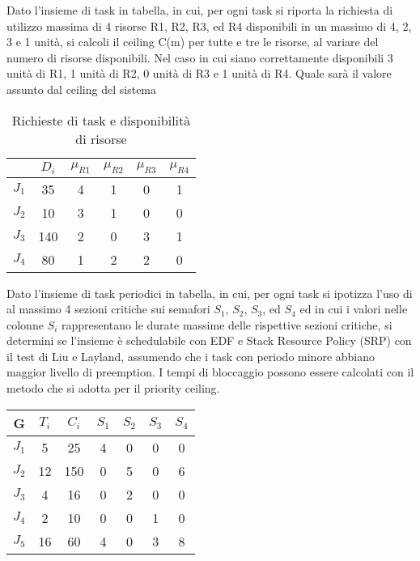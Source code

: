 \begin{Esercizio3}

Dato l'insieme di task in tabella, in cui, 
per ogni task si riporta la richiesta
 di utilizzo massima di 4 risorse R1, R2, R3, ed 
 R4 disponibili in un massimo di 4, 2, 3 e 1 unità, 
 si calcoli il ceiling C(m) per tutte e tre le risorse, 
 al variare del numero di risorse disponibili. 
 Nel caso in cui siano correttamente disponibili 3
  unità di R1, 1 unità di R2, 0 unità di R3 e 1 
  unità di R4. Quale sarà il valore assunto dal 
  ceiling del sistema 

  \begin{table}[!h]
\centering
\begin{tabular}{|c|c|c|c|c|c|}
\hline
& $D_i$ & $\mu_{R1}$ & $\mu_{R2}$ & $\mu_{R3}$ & $\mu_{R4}$ \\
\hline
$J_1$ & 35 & 4 & 1 & 0 & 1 \\
\hline
$J_2$ & 10 & 3 & 1 & 0 & 0 \\
\hline
$J_3$ & 140 & 2 & 0 & 3 & 1 \\
\hline
$J_4$ & 80 & 1 & 2 & 2 & 0 \\
\hline
\end{tabular}
\caption{Richieste di task e disponibilità di risorse}
\end{table}

\end{Esercizio3}


\begin{Esercizio4}

Dato l'insieme di task periodici in tabella, in cui, per ogni task si ipotizza 
l'uso di al massimo 4 sezioni critiche sui semafori $S_1$, $S_2$, $S_3$, ed $S_4$ 
ed in cui i valori nelle colonne $S_i$ rappresentano le durate massime delle 
rispettive sezioni critiche, si determini se l'insieme è schedulabile con EDF 
e Stack Resource Policy (SRP) con il test di Liu e Layland, assumendo che i task 
con periodo minore abbiano maggior livello di preemption. I tempi di bloccaggio 
possono essere calcolati con il metodo che si adotta per il priority ceiling.

\begin{table}[!h]
\centering
\begin{tabular}{|c|c|c|c|c|c|c|}
\hline
G & $T_i$ & $C_i$ & $S_1$ & $S_2$ & $S_3$ & $S_4$ \\
\hline
$J_1$ & 5 & 25 & 4 & 0 & 0 & 0 \\
\hline
$J_2$ & 12 & 150 & 0 & 5 & 0 & 6 \\
\hline
$J_3$ & 4 & 16 & 0 & 2 & 0 & 0 \\
\hline
$J_4$ & 2 & 10 & 0 & 0 & 1 & 0 \\
\hline
$J_5$ & 16 & 60 & 4 & 0 & 3 & 8 \\
\hline
\end{tabular}
\label{tab:task_esercizio3}
\end{table}


\end{Esercizio4}



